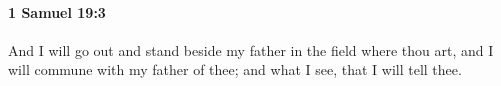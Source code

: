 
		\paragraph{1 Samuel 19:3} %
			\label{1SAMUEL-19-3}

			And I will go out and stand beside my father in the field where thou art, and I will commune with my father of thee; and what I see, that I will tell thee.


